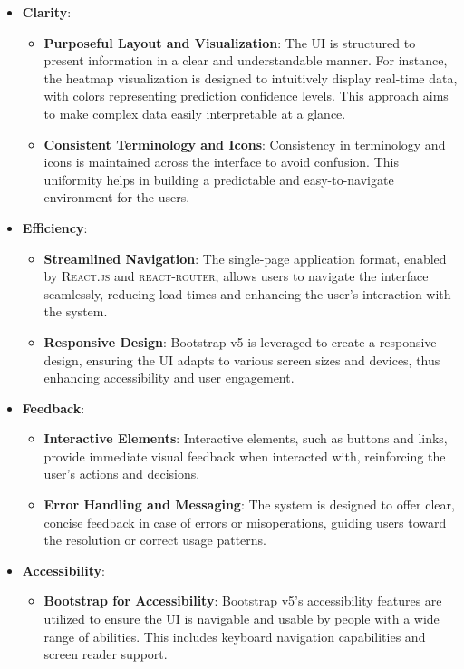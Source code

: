 \begin{itemize}
  \item \textbf{Clarity}: \begin{itemize}
          \item \textbf{Purposeful Layout and Visualization}: The UI is structured to present information in a clear and understandable manner. For instance, the heatmap visualization is designed to intuitively display real-time data, with colors representing prediction confidence levels. This approach aims to make complex data easily interpretable at a glance.
          \item \textbf{Consistent Terminology and Icons}: Consistency in terminology and icons is maintained across the interface to avoid confusion. This uniformity helps in building a predictable and easy-to-navigate environment for the users.
        \end{itemize}
  \item \textbf{Efficiency}: \begin{itemize}
          \item \textbf{Streamlined Navigation}: The single-page application format, enabled by \textsc{React.js} and \textsc{react-router}, allows users to navigate the interface seamlessly, reducing load times and enhancing the user's interaction with the system.
          \item \textbf{Responsive Design}: Bootstrap v5 is leveraged to create a responsive design, ensuring the UI adapts to various screen sizes and devices, thus enhancing accessibility and user engagement.
        \end{itemize}
  \item \textbf{Feedback}: \begin{itemize}
          \item \textbf{Interactive Elements}: Interactive elements, such as buttons and links, provide immediate visual feedback when interacted with, reinforcing the user’s actions and decisions.
          \item \textbf{Error Handling and Messaging}: The system is designed to offer clear, concise feedback in case of errors or misoperations, guiding users toward the resolution or correct usage patterns.
        \end{itemize}
  \item \textbf{Accessibility}: \begin{itemize}
          \item \textbf{Bootstrap for Accessibility}: Bootstrap v5’s accessibility features are utilized to ensure the UI is navigable and usable by people with a wide range of abilities. This includes keyboard navigation capabilities and screen reader support.

\end{itemize}
\end{itemize}
